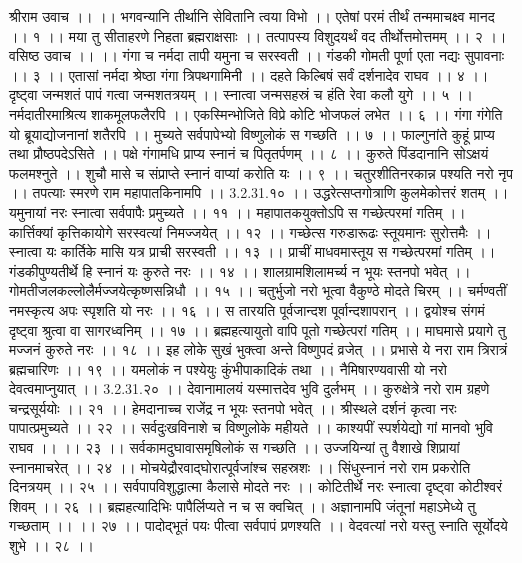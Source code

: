 श्रीराम उवाच ।। ।।
भगवन्यानि तीर्थानि सेवितानि त्वया विभो ।।
एतेषां परमं तीर्थं तन्ममाचक्ष्व मानद ।। १ ।।
मया तु सीताहरणे निहता ब्रह्मराक्षसाः ।।
तत्पापस्य विशुदयर्थं वद तीर्थोत्तमोत्तमम् ।। २ ।।
वसिष्ठ उवाच ।। ।।
गंगा च नर्मदा तापी यमुना च सरस्वती ।।
गंडकी गोमती पूर्णा एता नद्यः सुपावनाः ।। ३ ।।
एतासां नर्मदा श्रेष्ठा गंगा त्रिपथगामिनी ।।
दहते किल्बिषं सर्वं दर्शनादेव राघव ।। ४ ।।
दृष्ट्वा जन्मशतं पापं गत्वा जन्मशतत्रयम् ।।
स्नात्वा जन्मसहस्रं च हंति रेवा कलौ युगे ।। ५ ।।
नर्मदातीरमाश्रित्य शाकमूलफलैरपि ।।
एकस्मिन्भोजिते विप्रे कोटि भोजफलं लभेत ।। ६ ।।
गंगा गंगेति यो ब्रूयाद्योजनानां शतैरपि ।।
मुच्यते सर्वपापेभ्यो विष्णुलोकं स गच्छति ।। ७ ।।
फाल्गुनांते कुहूं प्राप्य तथा प्रौष्ठपदेऽसिते ।।
पक्षे गंगामधि प्राप्य स्नानं च पितृतर्पणम् ।। ८ ।।
कुरुते पिंडदानानि सोऽक्षयं फलमश्नुते ।।
शुचौ मासे च संप्राप्ते स्नानं वाप्यां करोति यः ।। ९ ।।
चतुरशीतिनरकान्न पश्यति नरो नृप ।।
तपत्याः स्मरणे राम महापातकिनामपि ।। 3.2.31.१० ।।
उद्धरेत्सप्तगोत्राणि कुलमेकोत्तरं शतम् ।।
यमुनायां नरः स्नात्वा सर्वपापैः प्रमुच्यते ।। ११ ।।
महापातकयुक्तोऽपि स गच्छेत्परमां गतिम् ।।
कार्त्तिक्यां कृत्तिकायोगे सरस्वत्यां निमज्जयेत् ।। १२ ।।
गच्छेत्स गरुडारूढः स्तूयमानः सुरोत्तमैः ।।
स्नात्वा यः कार्तिके मासि यत्र प्राची सरस्वती ।। १३ ।।
प्राचीं माधवमास्तूय स गच्छेत्परमां गतिम् ।।
गंडकीपुण्यतीर्थे हि स्नानं यः कुरुते नरः ।। १४ ।।
शालग्रामशिलामर्च्य न भूयः स्तनपो भवेत् ।।
गोमतीजलकल्लोलैर्मज्जयेत्कृष्णसन्निधौ ।। १५ ।।
चतुर्भुजो नरो भूत्वा वैकुण्ठे मोदते चिरम् ।।
चर्मण्वतीं नमस्कृत्य अपः स्पृशति यो नरः ।। १६ ।।
स तारयति पूर्वजान्दश पूर्वान्दशापरान् ।।
द्वयोश्च संगमं दृष्ट्वा श्रुत्वा वा सागरध्वनिम् ।। १७ ।।
ब्रह्महत्यायुतो वापि पूतो गच्छेत्परां गतिम् ।।
माघमासे प्रयागे तु मज्जनं कुरुते नरः ।। १८ ।।
इह लोके सुखं भुक्त्वा अन्ते विष्णुपदं व्रजेत् ।।
प्रभासे ये नरा राम त्रिरात्रं ब्रह्मचारिणः ।। १९ ।।
यमलोकं न पश्येयुः कुंभीपाकादिकं तथा ।।
नैमिषारण्यवासी यो नरो देवत्वमाप्नुयात् ।। 3.2.31.२० ।।
देवानामालयं यस्मात्तदेव भुवि दुर्लभम् ।।
कुरुक्षेत्रे नरो राम ग्रहणे चन्द्रसूर्ययोः ।। २१ ।।
हेमदानाच्च राजेंद्र न भूयः स्तनपो भवेत् ।।
श्रीस्थले दर्शनं कृत्वा नरः पापात्प्रमुच्यते ।। २२ ।।
सर्वदुःखविनाशे च विष्णुलोके महीयते ।।
काश्यपीं स्पर्शयेद्यो गां मानवो भुवि राघव ।। ।। २३ ।।
सर्वकामदुघावासमृषिलोकं स गच्छति ।।
उज्जयिन्यां तु वैशाखे शिप्रायां स्नानमाचरेत् ।। २४ ।।
मोचयेद्रौरवाद्घोरात्पूर्वजांश्च सहस्रशः ।।
सिंधुस्नानं नरो राम प्रकरोति दिनत्रयम् ।। २५ ।।
सर्वपापविशुद्धात्मा कैलासे मोदते नरः ।।
कोटितीर्थे नरः स्नात्वा दृष्ट्वा कोटीश्वरं शिवम् ।। २६ ।।
ब्रह्महत्यादिभिः पापैर्लिप्यते न च स क्वचित् ।।
अज्ञानामपि जंतूनां महाऽमेध्ये तु गच्छताम् ।। ।। २७ ।।
पादोद्भूतं पयः पीत्वा सर्वपापं प्रणश्यति ।।
वेदवत्यां नरो यस्तु स्नाति सूर्योदये शुभे ।। २८ ।।
